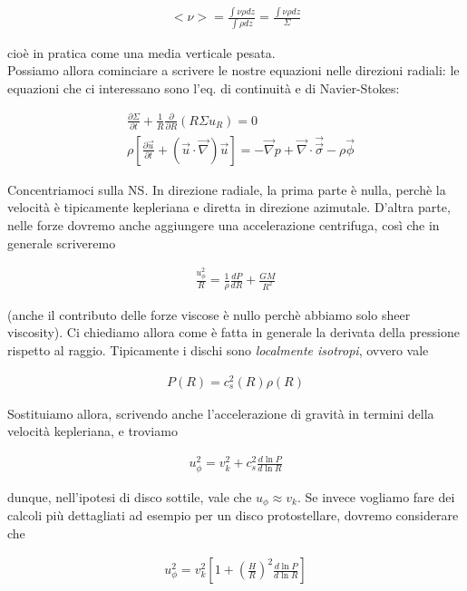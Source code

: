 \documentclass{report}
\begin{document}
\begin{align}
    <\nu> = \frac{\int \nu \rho dz}{\int \rho dz} = \frac{\int \nu \rho dz}{\Sigma}
\end{align}

cioè in pratica come una media verticale pesata. \\

Possiamo allora cominciare a scrivere le nostre equazioni nelle direzioni radiali: le equazioni che ci interessano sono l'eq. di continuità e di Navier-Stokes: 

\begin{align}
    &\frac{\partial \Sigma}{\partial t} + \frac{1}{R}\frac{\partial}{\partial R}(R\Sigma u_R) = 0 \\
    &\rho\left[\frac{\partial \vec{u}}{\partial t} + (\vec{u}\cdot \vec{\nabla})\vec{u}\right] = -\vec{\nabla}p + \vec{\nabla} \cdot \vec{\vec{\sigma}} - \rho \vec{\phi}
\end{align}

Concentriamoci sulla NS. In direzione radiale, la prima parte è nulla, perchè la velocità è tipicamente kepleriana e diretta in direzione azimutale. D'altra parte, nelle forze dovremo anche aggiungere una accelerazione centrifuga, così che in generale scriveremo 

\begin{align}
    \frac{u^2_\phi}{R} = \frac{1}{\rho}\frac{dP}{dR} + \frac{GM}{R^2}
\end{align}

(anche il contributo delle forze viscose è nullo perchè abbiamo solo sheer viscosity). Ci chiediamo allora come è fatta in generale la derivata della pressione rispetto al raggio. Tipicamente i dischi sono \emph{localmente isotropi}, ovvero vale 

\begin{align}
    P(R) = c^2_s (R)\rho(R)
\end{align}

Sostituiamo allora, scrivendo anche l'accelerazione di gravità in termini della velocità kepleriana, e troviamo 

\begin{align}
    u_\phi^2 = v_k^2 +c_s^2 \frac{d\ln P}{d\ln R}
\end{align}

dunque, nell'ipotesi di disco sottile, vale che \(u_\phi \approx v_k\). Se invece vogliamo fare dei calcoli più dettagliati ad esempio per un disco protostellare, dovremo considerare che 

\begin{align}
    u_\phi^2 = v_k^2 \left[1 + \left(\frac{H}{R}\right)^2 \frac{d\ln P}{d \ln R}\right]
\end{align}
\end{document}
